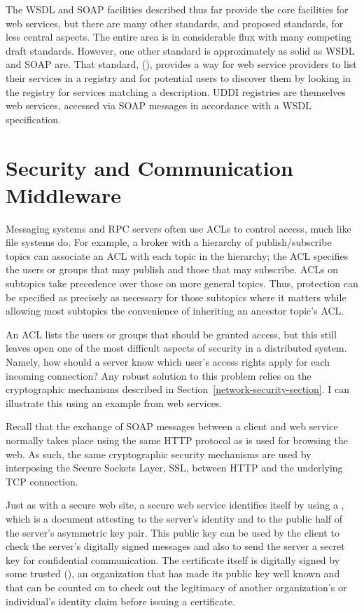 The WSDL and SOAP facilities described thus far provide the core
facilities for web services, but there are many other standards, and
proposed standards, for less central aspects.  The entire area is in
considerable flux with many competing draft standards.
However, one other standard is approximately as solid as
WSDL and SOAP are.  That standard,  (), provides a way for web service
providers to list their services in a registry and for potential
users to discover them by looking in the registry for services
matching a description.  UDDI registries are themselves web services,
accessed via SOAP messages in accordance with a WSDL specification.

\section{Security and Communication
  Middleware}\label{distmid-security-section}

Messaging systems and RPC servers often use ACLs to control access,
much like file systems do.  For example, a broker with a hierarchy of
publish/subscribe topics can associate
an ACL with each topic in the hierarchy; the ACL specifies the users or groups that may publish and
those that may subscribe.  ACLs on subtopics take
precedence over those on more general topics.  Thus, protection can be
specified as precisely as necessary for those subtopics where it
matters while allowing most subtopics the convenience of inheriting
an ancestor topic's ACL.

An ACL lists the users or groups that should be granted access, but
this still leaves open one of the most difficult aspects of security
in a distributed system.  Namely, how should a server know which
user's access rights apply for each incoming connection?  Any robust
solution to this problem relies on the cryptographic mechanisms
described in Section~\ref{network-security-section}.  I can illustrate
this using an example from web services.

Recall that the exchange of SOAP messages between a client and web
service normally takes place using the same HTTP protocol as is used
for browsing the web.  As such, the same cryptographic security
mechanisms are used by interposing the Secure Sockets Layer, SSL,
between HTTP and the underlying TCP connection.

Just as with a secure web site, a secure web service identifies itself
by using a , which is a document attesting to the
server's identity and to the public half of the server's asymmetric
key pair.  This public key can be used by the client to check the
server's digitally signed
messages and also to send the server a secret key for
confidential communication.  The certificate itself is digitally
signed by some trusted  (),
an organization that has made its public key well known and that can be
counted on to check out the legitimacy of another organization's or
individual's identity claim before issuing a certificate.

